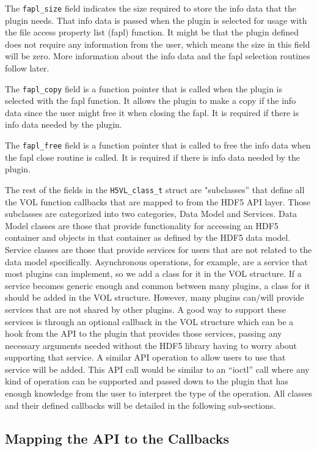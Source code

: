 The {\tt fapl\_size} field indicates the size required to store the
info data that the plugin needs. That info data is passed when the
plugin is selected for usage with the file access property list (fapl)
function. It might be that the plugin defined does not require any
information from the user, which means the size in this field will be
zero. More information about the info data and the fapl selection
routines follow later.

The {\tt fapl\_copy} field is a function pointer that is called when
the plugin is selected with the fapl function. It allows the plugin to
make a copy if the info data since the user might free it when closing
the fapl. It is required if there is info data needed by the plugin.

The {\tt fapl\_free} field is a function pointer that is called to
free the info data when the fapl close routine is called. It is
required if there is info data needed by the plugin.

The rest of the fields in the {\tt H5VL\_class\_t} struct are "subclasses'' that define all the VOL function callbacks that
are mapped to from the HDF5 API layer. Those subclasses are categorized into two categories, Data Model and Services. Data Model classes are those that provide functionality for accessing an HDF5 container and objects in that container as defined by the HDF5 data model.  Service classes are those that provide services for users that are not related to the data model specifically. Asynchronous operations, for example, are a service that most plugins can implement, so we add a class for it in the VOL structure. If a service becomes generic enough and common between many plugins, a class for it should be added in the VOL structure. However, many plugins can/will provide services that are not shared by other plugins. A good way to support these services is through an optional callback in the VOL structure which can be a hook from the API to the plugin that provides those services, passing any necessary arguments needed without the HDF5 library having to worry about supporting that service. A similar API operation to allow users to use that service will be added. This API call would be similar to an “ioctl” call where any kind of operation can be supported and passed down to the plugin that has enough knowledge from the user to interpret the type of the operation. All classes and their defined callbacks will be detailed in the following sub-sections.

\subsection{Mapping the API to the Callbacks}
\label{sec:map}

